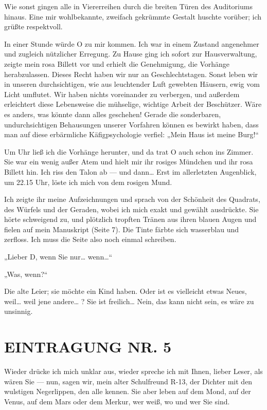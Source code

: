 Wie sonst gingen alle in Viererreihen durch die breiten Türen des
Auditoriums hinaus. Eine mir wohlbekannte, zweifach gekrümmte
Gestalt huschte vorüber; ich grüßte respektvoll.

In einer Stunde würde O zu mir kommen. Ich war in einem Zustand
angenehmer und zugleich nützlicher Erregung. Zu Hause ging ich
sofort zur Hausverwaltung, zeigte mein rosa Billett vor und erhielt
die Genehmigung, die Vorhänge herabzulassen. Dieses Recht haben wir
nur an Geschlechtstagen. Sonst leben wir in unseren durchsichtigen,
wie aus leuchtender Luft gewebten Häusern, ewig vom Licht umflutet.
Wir haben nichts voreinander zu verbergen, und außerdem erleichtert
diese Lebensweise die mühselige, wichtige Arbeit der Beschützer.
Wäre es anders, was könnte dann alles geschehen! Gerade die
sonderbaren, undurchsichtigen Behausungen unserer Vorfahren können
es bewirkt haben, dass man auf diese erbärmliche Käfigpsychologie
verfiel: „Mein Haus ist meine Burg!“

Um  Uhr ließ ich die Vorhänge herunter, und da trat O auch schon
ins Zimmer. Sie war ein wenig außer Atem und hielt mir ihr rosiges
Mündchen und ihr rosa Billett hin. Ich riss den Talon ab — und
dann\ldots{} Erst im allerletzten Augenblick, um 22.15 Uhr, löste ich
mich von dem rosigen Mund.

Ich zeigte ihr meine Aufzeichnungen und sprach von der Schönheit
des Quadrats, des Würfels und der Geraden, wobei ich mich exakt und
gewählt ausdrückte. Sie hörte schweigend zu, und plötzlich tropften
Tränen aus ihren blauen Augen und fielen auf mein Manuskript (Seite
7). Die Tinte färbte sich wasserblau und zerfloss. Ich muss die
Seite also noch einmal schreiben.

„Lieber D, wenn Sie nur\ldots{}
wenn\ldots{}“

„Was, wenn?“

Die alte Leier; sie möchte ein Kind haben. Oder ist es vielleicht
etwas Neues, weil\ldots{} weil jene andere\ldots{} ? Sie ist freilich\ldots{}
Nein, das kann nicht sein, es wäre zu unsinnig.

\section{EINTRAGUNG NR. 5}

Wieder drücke ich mich unklar aus, wieder spreche ich mit Ihnen,
lieber Leser, als wären Sie — nun, sagen wir, mein alter
Schulfreund R-13, der Dichter mit den wulstigen Negerlippen, den
alle kennen. Sie aber leben auf dem Mond, auf der Venus, auf dem
Mars oder dem Merkur, wer weiß, wo und wer Sie sind.

